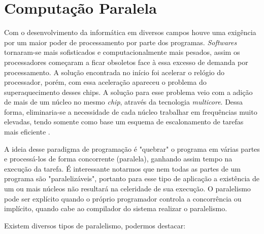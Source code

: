 \section{Computação Paralela}

Com o desenvolvimento da informática em diversos campos houve uma exigência por um maior poder de processamento por parte dos programas. \textit{Softwares} tornaram-se mais sofisticados e computacionalmente mais pesados, assim os processadores começaram a ficar obsoletos face à essa excesso de demanda por processamento. A solução encontrada no início foi acelerar o relógio do processador, porém, com essa aceleração apareceu o problema do superaquecimento desses chips. A solução para esse problema veio com a adição de mais de um núcleo no mesmo \textit{chip}, através da tecnologia \textit{multicore}. Dessa forma, eliminaria-se a necessidade de cada núcleo trabalhar em frequências muito elevadas, tendo somente como base um esquema de escalonamento de tarefas mais eficiente \cite{tanenbaum2013sistemas}.

A ideia desse paradigma de programação é "quebrar" o programa em várias partes e processá-los de forma concorrente (paralela), ganhando assim tempo na execução da tarefa. É interessante notarmos que nem todas as partes de um programa são "paralelizáveis", portanto para esse tipo de aplicação a existência de um ou mais núcleos não resultará na celeridade de sua execução. O paralelismo pode ser explícito quando o próprio programador controla a concorrência ou implícito, quando cabe ao compilador do sistema realizar o paralelismo.

Existem diversos tipos de paralelismo, podermos destacar: 

